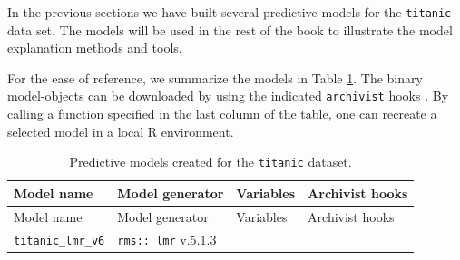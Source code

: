 \documentclass[12pt,]{krantz}
\begin{document}
In the previous sections we have built several predictive models for the \texttt{titanic} data set. The models will be used in the rest of the book to illustrate the model explanation methods and tools.

For the ease of reference, we summarize the models in Table \ref{tab:archivistHooksOfModelsTitanic}. The binary model-objects can be downloaded by using the indicated \texttt{archivist} hooks \citep{archivist}. By calling a function specified in the last column of the table, one can recreate a selected model in a local R environment.

\begin{longtable}[]{@{}llll@{}}
\caption{\label{tab:archivistHooksOfModelsTitanic} Predictive models created for the \texttt{titanic} dataset.}\tabularnewline
\toprule
\begin{minipage}[b]{0.21\columnwidth}\raggedright
Model name\strut
\end{minipage} & \begin{minipage}[b]{0.25\columnwidth}\raggedright
Model generator\strut
\end{minipage} & \begin{minipage}[b]{0.18\columnwidth}\raggedright
Variables\strut
\end{minipage} & \begin{minipage}[b]{0.25\columnwidth}\raggedright
Archivist hooks\strut
\end{minipage}\tabularnewline
\midrule
\endfirsthead
\toprule
\begin{minipage}[b]{0.21\columnwidth}\raggedright
Model name\strut
\end{minipage} & \begin{minipage}[b]{0.25\columnwidth}\raggedright
Model generator\strut
\end{minipage} & \begin{minipage}[b]{0.18\columnwidth}\raggedright
Variables\strut
\end{minipage} & \begin{minipage}[b]{0.25\columnwidth}\raggedright
Archivist hooks\strut
\end{minipage}\tabularnewline
\midrule
\endhead
\begin{minipage}[t]{0.21\columnwidth}\raggedright
\texttt{titanic\_lmr\_v6}\strut
\end{minipage} & \begin{minipage}[t]{0.25\columnwidth}\raggedright
\texttt{rms::\ lmr} v.5.1.3\strut
\end{minipage} & \begin{minipage}[t]{0.18\columnwidth}\raggedright

\end{minipage}
\end{longtable}
\end{document}
